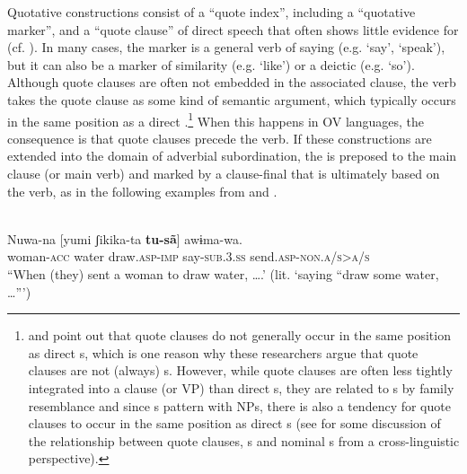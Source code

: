 \documentclass[output=paper]{langsci/langscibook}
\begin{document}
Quotative constructions consist of a “quote index”, including a “quotative mark\-er”, and a “quote clause” of direct speech that often shows little evidence for  (cf. \citealt{Güldemann2008}). In many cases, the  marker is a general verb of saying (e.g. ‘say’, ‘speak’), but it can also be a marker of similarity (e.g. ‘like’) or a  deictic (e.g. ‘so’). Although quote clauses are often not embedded in the associated clause, the  verb takes the quote clause as some kind of semantic argument, which typically occurs in the same position as a direct .\footnote{\citet{Munro1982} and \citet{Güldemann2008} point out that quote clauses do not generally occur in the same position as direct s, which is one reason why these researchers argue that quote clauses are not (always) s. However, while quote clauses are often less tightly integrated into a clause (or VP) than direct s, they are related to  s by family resemblance and since  s pattern with  NPs, there is also a tendency for quote clauses to occur in the same position as direct s (see \citealt{Schmidtke-BodeDiessel2017} for some discussion of the relationship between quote clauses,  s and nominal s from a cross-linguistic perspective).} When this happens in OV languages, the consequence is that quote clauses precede the  verb. If these constructions are extended into the domain of adverbial subordination, the  is preposed to the main clause (or main verb) and marked by a clause-final  that is ultimately based on the  verb, as in the following examples from   and  .

\ea\label{ex:diessel:15}
\\
\gll   Nuwa-na  [yumi  ʃikika-ta  \textbf{tu-sã}]  awɨma-wa.\\
       woman-\textsc{acc}  water  draw.\textsc{asp-imp}  say-\textsc{sub.3.ss}  send.\textsc{asp-non.a/s>a/s}\\
\glt “When (they) sent a woman to draw water, ….' (lit. ‘saying “draw some water, …”’) 
\z
\end{document}
